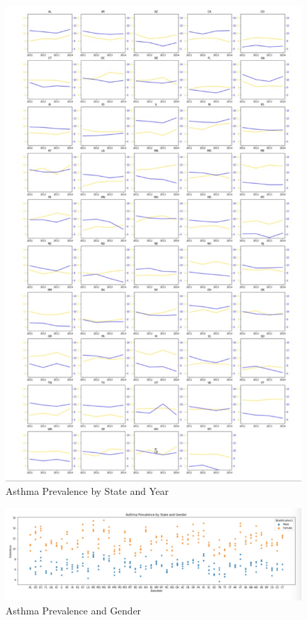 \documentclass{article}
\begin{document}

\begin{figure}[h]
\centering
\caption{\label{fig:figure20}Asthma Prevalence by State and Year}
\includegraphics[width=1.0\textwidth]{Asthma-State and Year.png}
\end{figure}

\begin{figure}[h]
\centering
\caption{\label{fig:figure21}Asthma Prevalence and Gender}
\includegraphics[width=1.0\textwidth]{Asthma Prevalence and Gender.png}
\end{figure}
\end{document}
